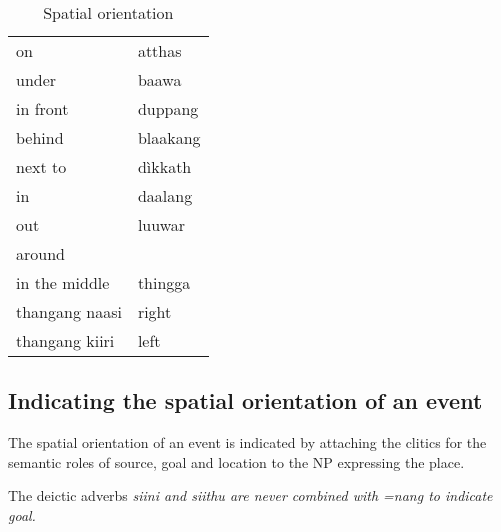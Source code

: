 \begin{table}
	\centering
		\begin{tabular}{ll}
			on & atthas\\
			under & baawa\\
			in front & duppang\\
			behind &blaakang\\
			next to & dìkkath\\
			in & daalang\\
  			out & luuwar\\
			around\\
			in the middle& thingga\\
			thangang naasi & right\\
 			thangang kiiri & left\\
		\end{tabular}
	\caption[Spatial orientation]{Spatial orientation}
	\label{tab:SpatialOrientation}
\end{table}




\subsection{Indicating the spatial orientation of an event}\label{sec:func:Indicatingthespatialorientationofanevent}
The spatial orientation of an event is indicated by attaching the clitics for the semantic roles of source, goal and location   to the  NP expressing the place.


The deictic adverbs \em siini \em and \em siithu \em  are never combined with \em =nang \em to indicate  goal.

 \\

\\

